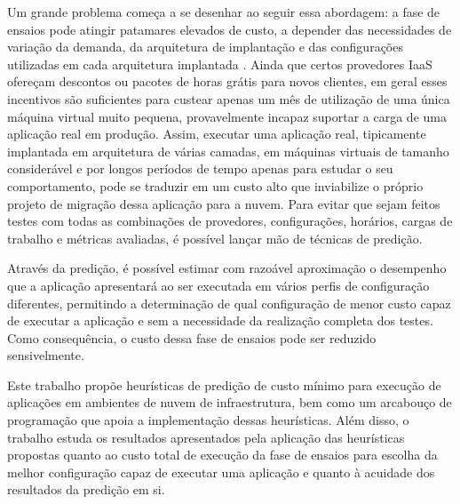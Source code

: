 Um grande problema começa a se desenhar ao seguir essa abordagem: a fase de ensaios pode atingir 
patamares elevados de custo, a depender das necessidades de variação da demanda, da arquitetura 
de implantação e das configurações utilizadas em cada arquitetura implantada 
\cite{silva2013cloudbench}. Ainda que certos provedores IaaS ofereçam descontos ou pacotes de 
horas grátis para novos clientes, em geral esses incentivos são suficientes para custear apenas 
um mês de utilização de uma única máquina virtual muito pequena, provavelmente incapaz suportar 
a carga de uma aplicação real em produção. Assim, executar uma aplicação real, tipicamente 
implantada em arquitetura de várias camadas, em máquinas virtuais de tamanho considerável e por 
longos períodos de tempo apenas para estudar o seu comportamento, pode se traduzir em um custo 
alto que inviabilize o próprio projeto de migração dessa aplicação para a nuvem. Para evitar 
que sejam feitos testes com todas as combinações de provedores, configurações, horários, cargas 
de trabalho e métricas avaliadas, é possível lançar mão de técnicas de predição.

Através da predição, é possível estimar com razoável aproximação o desempenho que a aplicação 
apresentará ao ser executada em vários perfis de configuração diferentes, permitindo a 
determinação de qual configuração de menor custo capaz de executar a aplicação e sem a 
necessidade da realização completa dos testes. Como consequência, o custo dessa fase de 
ensaios pode ser reduzido sensivelmente.

Este trabalho propõe heurísticas de predição de custo mínimo para execução de aplicações 
em ambientes de nuvem de infraestrutura, bem como um arcabouço de programação que apoia a 
implementação dessas heurísticas. Além disso, o trabalho estuda os resultados apresentados 
pela aplicação das heurísticas propostas quanto ao custo total de execução da fase de ensaios 
para escolha da melhor configuração capaz de executar uma aplicação e quanto à acuidade dos 
resultados da predição em si.
